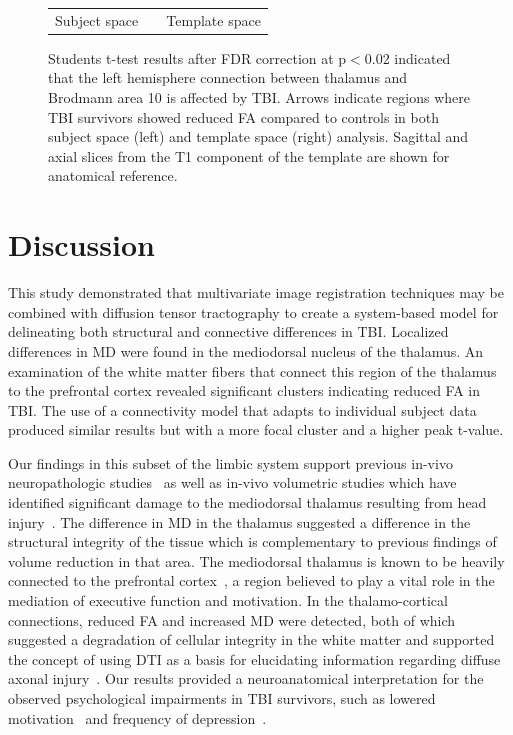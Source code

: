 \begin{figure}
\begin{center}
\begin{tabular}{ccc}
\textrm{Subject space} & & \textrm{Template space} \\
\end{tabular}
\caption{Students t-test results after FDR correction at p$<$0.02 indicated that the left hemisphere connection between thalamus and Brodmann area 10 is affected by TBI. Arrows indicate regions where TBI survivors showed reduced FA compared to controls in both subject space (left) and template space (right) analysis. Sagittal and axial slices from the T1 component of the template are shown for anatomical reference.}
\label{fig:connstats}
\end{center}
\end{figure}

\section{Discussion}
This study demonstrated that multivariate image registration techniques may be combined with diffusion tensor tractography to create a system-based model for delineating both structural and connective differences in TBI. Localized differences in MD were found in the mediodorsal nucleus of the thalamus. An examination of the white matter fibers that connect this region of the thalamus to the prefrontal cortex revealed significant clusters indicating reduced FA in TBI. The use of a connectivity model that adapts to individual subject data produced similar results but with a more focal cluster and a higher peak t-value.

Our findings in this subset of the limbic system support previous in-vivo neuropathologic studies~\cite{Graham2005,Maxwell2006} as well as in-vivo volumetric studies which have identified significant damage to the mediodorsal thalamus resulting from head injury~\cite{Kim2008}. The difference in MD in the thalamus suggested a difference in the structural integrity of the tissue which is complementary to previous findings of volume reduction in that area\cite{Kim2008}. The mediodorsal thalamus is known to be heavily connected to the prefrontal cortex~\cite{Goldman85}, a region believed to play a vital role in the mediation of executive function and motivation. In the thalamo-cortical connections, reduced FA and increased MD were detected, both of which suggested a degradation of cellular integrity in the white matter and supported the concept of using DTI as a basis for elucidating information regarding diffuse axonal injury~\cite{Huisman04}. Our results provided a neuroanatomical interpretation for the observed psychological impairments in TBI survivors, such as lowered motivation~\cite{Kraus2007,O'Sullivan2004} and frequency of depression~\cite{Drevets2000,Chen2008}.  

